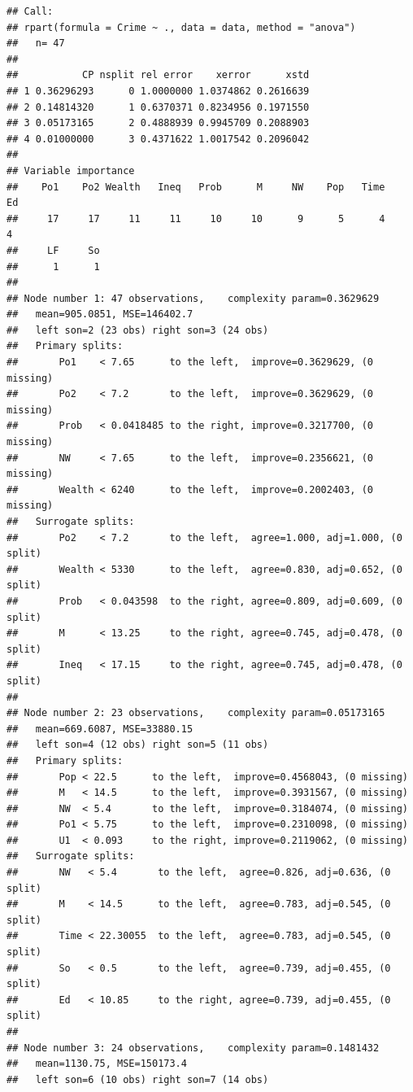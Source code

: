 \documentclass[]{article}
\begin{document}
\begin{verbatim}
## Call:
## rpart(formula = Crime ~ ., data = data, method = "anova")
##   n= 47 
## 
##           CP nsplit rel error    xerror      xstd
## 1 0.36296293      0 1.0000000 1.0374862 0.2616639
## 2 0.14814320      1 0.6370371 0.8234956 0.1971550
## 3 0.05173165      2 0.4888939 0.9945709 0.2088903
## 4 0.01000000      3 0.4371622 1.0017542 0.2096042
## 
## Variable importance
##    Po1    Po2 Wealth   Ineq   Prob      M     NW    Pop   Time     Ed 
##     17     17     11     11     10     10      9      5      4      4 
##     LF     So 
##      1      1 
## 
## Node number 1: 47 observations,    complexity param=0.3629629
##   mean=905.0851, MSE=146402.7 
##   left son=2 (23 obs) right son=3 (24 obs)
##   Primary splits:
##       Po1    < 7.65      to the left,  improve=0.3629629, (0 missing)
##       Po2    < 7.2       to the left,  improve=0.3629629, (0 missing)
##       Prob   < 0.0418485 to the right, improve=0.3217700, (0 missing)
##       NW     < 7.65      to the left,  improve=0.2356621, (0 missing)
##       Wealth < 6240      to the left,  improve=0.2002403, (0 missing)
##   Surrogate splits:
##       Po2    < 7.2       to the left,  agree=1.000, adj=1.000, (0 split)
##       Wealth < 5330      to the left,  agree=0.830, adj=0.652, (0 split)
##       Prob   < 0.043598  to the right, agree=0.809, adj=0.609, (0 split)
##       M      < 13.25     to the right, agree=0.745, adj=0.478, (0 split)
##       Ineq   < 17.15     to the right, agree=0.745, adj=0.478, (0 split)
## 
## Node number 2: 23 observations,    complexity param=0.05173165
##   mean=669.6087, MSE=33880.15 
##   left son=4 (12 obs) right son=5 (11 obs)
##   Primary splits:
##       Pop < 22.5      to the left,  improve=0.4568043, (0 missing)
##       M   < 14.5      to the left,  improve=0.3931567, (0 missing)
##       NW  < 5.4       to the left,  improve=0.3184074, (0 missing)
##       Po1 < 5.75      to the left,  improve=0.2310098, (0 missing)
##       U1  < 0.093     to the right, improve=0.2119062, (0 missing)
##   Surrogate splits:
##       NW   < 5.4       to the left,  agree=0.826, adj=0.636, (0 split)
##       M    < 14.5      to the left,  agree=0.783, adj=0.545, (0 split)
##       Time < 22.30055  to the left,  agree=0.783, adj=0.545, (0 split)
##       So   < 0.5       to the left,  agree=0.739, adj=0.455, (0 split)
##       Ed   < 10.85     to the right, agree=0.739, adj=0.455, (0 split)
## 
## Node number 3: 24 observations,    complexity param=0.1481432
##   mean=1130.75, MSE=150173.4 
##   left son=6 (10 obs) right son=7 (14 obs)

\end{verbatim}
\end{document}

